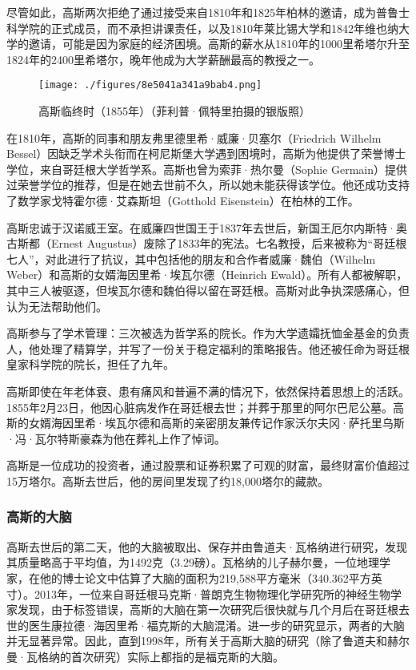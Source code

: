 尽管如此，高斯两次拒绝了通过接受来自1810年和1825年柏林的邀请，成为普鲁士科学院的正式成员，而不承担讲课责任，以及1810年莱比锡大学和1842年维也纳大学的邀请，可能是因为家庭的经济困境。高斯的薪水从1810年的1000里希塔尔升至1824年的2400里希塔尔，晚年他成为大学薪酬最高的教授之一。
\begin{figure}[ht]
\centering
\texttt{[image: ./figures/8e5041a341a9bab4.png]}
\caption{高斯临终时（1855年）（菲利普·佩特里拍摄的银版照）} \label{fig_KRGS_8}
\end{figure}
在1810年，高斯的同事和朋友弗里德里希·威廉·贝塞尔（Friedrich Wilhelm Bessel）因缺乏学术头衔而在柯尼斯堡大学遇到困境时，高斯为他提供了荣誉博士学位，来自哥廷根大学哲学系。高斯也曾为索菲·热尔曼（Sophie Germain）提供过荣誉学位的推荐，但是在她去世前不久，所以她未能获得该学位。他还成功支持了数学家戈特霍尔德·艾森斯坦（Gotthold Eisenstein）在柏林的工作。

高斯忠诚于汉诺威王室。在威廉四世国王于1837年去世后，新国王厄尔内斯特·奥古斯都（Ernest Augustus）废除了1833年的宪法。七名教授，后来被称为“哥廷根七人”，对此进行了抗议，其中包括他的朋友和合作者威廉·魏伯（Wilhelm Weber）和高斯的女婿海因里希·埃瓦尔德（Heinrich Ewald）。所有人都被解职，其中三人被驱逐，但埃瓦尔德和魏伯得以留在哥廷根。高斯对此争执深感痛心，但认为无法帮助他们。

高斯参与了学术管理：三次被选为哲学系的院长。作为大学遗孀抚恤金基金的负责人，他处理了精算学，并写了一份关于稳定福利的策略报告。他还被任命为哥廷根皇家科学院的院长，担任了九年。

高斯即使在年老体衰、患有痛风和普遍不满的情况下，依然保持着思想上的活跃。1855年2月23日，他因心脏病发作在哥廷根去世；并葬于那里的阿尔巴尼公墓。高斯的女婿海因里希·埃瓦尔德和高斯的亲密朋友兼传记作家沃尔夫冈·萨托里乌斯·冯·瓦尔特斯豪森为他在葬礼上作了悼词。

高斯是一位成功的投资者，通过股票和证券积累了可观的财富，最终财富价值超过15万塔尔。高斯去世后，他的房间里发现了约18,000塔尔的藏款。
\subsubsection{高斯的大脑}  
高斯去世后的第二天，他的大脑被取出、保存并由鲁道夫·瓦格纳进行研究，发现其质量略高于平均值，为1492克（3.29磅）。瓦格纳的儿子赫尔曼，一位地理学家，在他的博士论文中估算了大脑的面积为219,588平方毫米（340.362平方英寸）。2013年，一位来自哥廷根马克斯·普朗克生物物理化学研究所的神经生物学家发现，由于标签错误，高斯的大脑在第一次研究后很快就与几个月后在哥廷根去世的医生康拉德·海因里希·福克斯的大脑混淆。进一步的研究显示，两者的大脑并无显著异常。因此，直到1998年，所有关于高斯大脑的研究（除了鲁道夫和赫尔曼·瓦格纳的首次研究）实际上都指的是福克斯的大脑。
